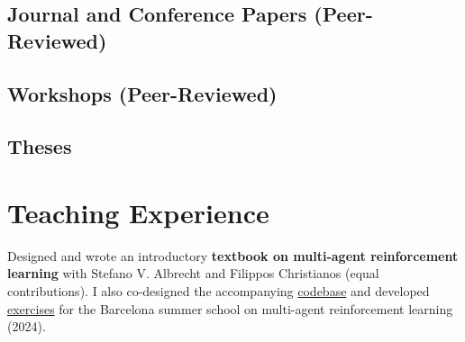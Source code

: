 \documentclass[a4paper,12pt]{article}
\begin{document}

\subsection{Journal and Conference Papers (Peer-Reviewed)}
\printbibliography[heading=none, filter=conf_jour, notkeyword=skip]%

\subsection{Workshops (Peer-Reviewed)}
\printbibliography[heading=none, keyword=workshop, notkeyword=skip]%


\subsection{Theses}
\printbibliography[heading=none, keyword=thesis, notkeyword=skip]%
\expspace

\section{Teaching Experience}

\begin{expblock}
    Designed and wrote an introductory \textbf{textbook on multi-agent reinforcement learning} with Stefano V. Albrecht and Filippos Christianos (equal contributions). I also co-designed the accompanying \href{https://github.com/marl-book/codebase}{codebase} and developed \href{https://github.com/marl-book/marl-book-exercises}{exercises} for the Barcelona summer school on multi-agent reinforcement learning (2024).
\end{expblock}
\end{document}

